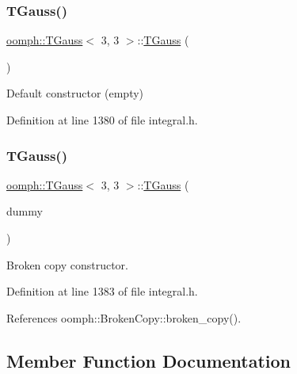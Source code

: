 \subsubsection{\texorpdfstring{T\+Gauss()}{TGauss()}\hspace{0.1cm}{\footnotesize\ttfamily [1/2]}}
{\footnotesize\ttfamily \hyperlink{classoomph_1_1TGauss}{oomph\+::\+T\+Gauss}$<$ 3, 3 $>$\+::\hyperlink{classoomph_1_1TGauss}{T\+Gauss} (\begin{DoxyParamCaption}{ }\end{DoxyParamCaption})\hspace{0.3cm}{\ttfamily [inline]}}



Default constructor (empty) 



Definition at line 1380 of file integral.\+h.

\mbox{\label{classoomph_1_1TGauss_3_013_00_013_01_4_aa7c77e04f33f1d06b64bc211fd9b9939}} 
\subsubsection{\texorpdfstring{T\+Gauss()}{TGauss()}\hspace{0.1cm}{\footnotesize\ttfamily [2/2]}}
{\footnotesize\ttfamily \hyperlink{classoomph_1_1TGauss}{oomph\+::\+T\+Gauss}$<$ 3, 3 $>$\+::\hyperlink{classoomph_1_1TGauss}{T\+Gauss} (\begin{DoxyParamCaption}\item[{const \hyperlink{classoomph_1_1TGauss}{T\+Gauss}$<$ 3, 3 $>$ \&}]{dummy }\end{DoxyParamCaption})\hspace{0.3cm}{\ttfamily [inline]}}



Broken copy constructor. 



Definition at line 1383 of file integral.\+h.



References oomph\+::\+Broken\+Copy\+::broken\+\_\+copy().



\subsection{Member Function Documentation}
\mbox{\label{classoomph_1_1TGauss_3_013_00_013_01_4_abf8708f90ae211884e4e544d30a60dcd}} 

